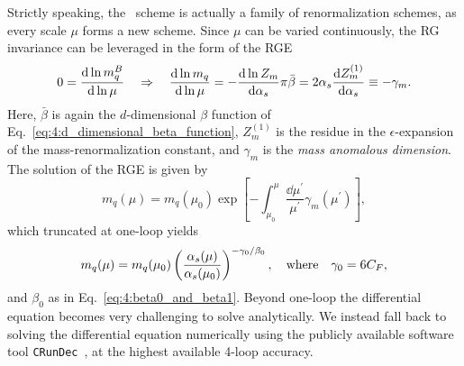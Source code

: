 Strictly speaking, the \MS\ scheme is actually a family of renormalization schemes, as every scale $\mu$ forms a new scheme. Since $\mu$ can be varied continuously, the \acs{RG} invariance can be leveraged in the form of the \acs{RGE}
\begin{equation}
0 = \frac{\mathrm{d} \ln m_q^B}{\mathrm{d} \ln \mu} \quad \Rightarrow \quad \frac{\mathrm{d} \ln m_q}{\mathrm{d} \ln \mu} = - \frac{\mathrm{d} \ln Z_m}{\mathrm{d} \alpha_s} \pi \bar{\beta} = 2 \alpha_s \frac{\mathrm{d} Z_m^{(1)}}{\mathrm{d} \alpha_s} \equiv - \gamma_m.
\end{equation}
Here, $\bar{\beta}$ is again the $d$-dimensional $\beta$ function of Eq.~\eqref{eq:4:d_dimensional_beta_function}, $Z_m^{(1)}$ is the residue in the $\epsilon$-expansion of the mass-renormalization constant, and $\gamma_m$ is the \textit{mass anomalous dimension}. The solution of the \acs{RGE} is given by
\begin{equation}
m_q (\mu) = m_q(\mu_0) \exp\!\left[- \int_{\mu_0}^\mu \frac{\dd \mu^\prime}{\mu^\prime} \gamma_m(\mu^\prime) \right],
\end{equation}
which truncated at one-loop yields
\begin{equation}
m_q(\mu) = m_q(\mu_0) \left( \frac{\alpha_s(\mu)}{\alpha_s (\mu_0)} \right)^{- \gamma_0/\beta_0}, \quad \text{where} \quad \gamma_0 = 6 C_F,
\end{equation}
and $\beta_0$ as in Eq.~\eqref{eq:4:beta0_and_beta1}. Beyond one-loop the differential equation becomes very challenging to solve analytically. We instead fall back to solving the differential equation numerically using the publicly available software tool \texttt{CRunDec}~\cite{Schmidt:2012az}, at the highest available 4-loop accuracy.
